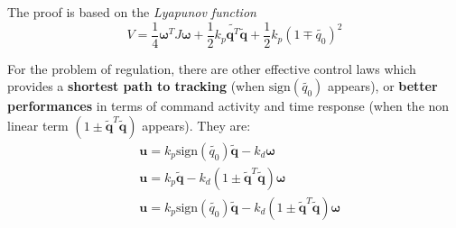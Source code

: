 \hspace*{-5mm}
%

\vspace{0.5cm}
\noindent
The proof is based on the \textit{Lyapunov function}
\begin{equation*}
    V = \frac{1}{4}\boldsymbol{\omega}^T J \boldsymbol{\omega}+
    \frac{1}{2}k_p \tilde{\mathbf{q}^T}\tilde{\mathbf{q}}+
    \frac{1}{2}k_p(1\mp\tilde{q_0})^2
\end{equation*}

For the problem of regulation, there are other effective control laws which provides a \textbf{shortest path to tracking} (when $\text{sign}(\tilde{q_0})$ appears), or \textbf{better performances} in terms of command activity and time response (when the non linear term $(1\pm \tilde{\mathbf{q}}^T \tilde{\mathbf{q}})$ appears). They are:
\begin{align}
    &\mathbf{u} = k_p\text{sign}(\tilde{q_0})\tilde{\mathbf{q}}-k_d\boldsymbol{\omega}\\
    &\mathbf{u} = k_p\tilde{\mathbf{q}}-k_d(1\pm \tilde{\mathbf{q}}^T \tilde{\mathbf{q}})\boldsymbol{\omega}\\
    &\mathbf{u} = k_p\text{sign}(\tilde{q_0})\tilde{\mathbf{q}}-k_d(1\pm \tilde{\mathbf{q}}^T \tilde{\mathbf{q}})\boldsymbol{\omega}
\end{align}

